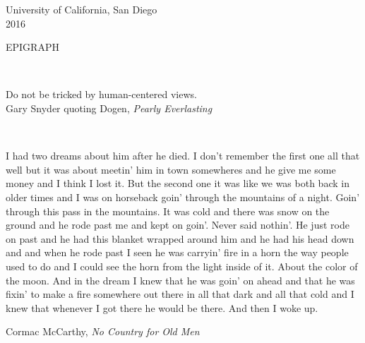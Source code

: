 \documentclass[12pt, oneside]{book}
\begin{document}
\begingroup
  \centering
  University of California, San Diego \\[2ex]
  2016 \par
\endgroup


\clearpage {} {}
\singlespacing
\begingroup
	\centering 
	EPIGRAPH \par
\endgroup

$\, $ \vspace{2ex}

\begin{flushright}
Do not be tricked by human-centered views. \\[2ex]
Gary Snyder quoting Dogen, \textit{Pearly Everlasting}
\end{flushright}

$\, $ \vfill
 
I had two dreams about him after he died. I don't remember the first one all that well but it was about meetin' him in town somewheres and he give me some money and I think I lost it. But the second one it was like we was both back in older times and I was on horseback goin' through the mountains of a night. Goin' through this pass in the mountains. It was cold and there was snow on the ground and he rode past me and kept on goin'. Never said nothin'. He just rode on past and he had this blanket wrapped around him and he had his head down and and when he rode past I seen he was carryin' fire in a horn the way people used to do and I could see the horn from the light inside of it. About the color of the moon. And in the dream I knew that he was goin' on ahead and that he was fixin' to make a fire somewhere out there in all that dark and all that cold and I knew that whenever I got there he would be there.
And then I woke up.

\begin{flushright}
Cormac McCarthy, \textit{No Country for Old Men}
\end{flushright}


\clearpage {} {}
\singlespacing
\renewcommand\contentsname{Table of Contents}
{\let\cleardoublepage\relax \tableofcontents}

\clearpage {} {}
{\let\cleardoublepage\relax \listoffigures}
\end{document}
